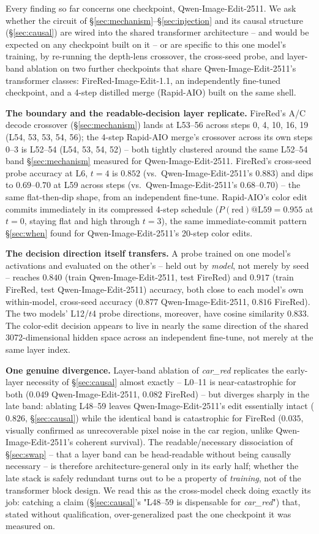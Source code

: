 \documentclass[10pt,twocolumn]{article}
\newcommand{\model}{Qwen-Image-Edit-2511}
\begin{document}
Every finding so far concerns one checkpoint, \model{}. We ask whether the
circuit of \S\ref{sec:mechanism}--\S\ref{sec:injection} and its causal
structure (\S\ref{sec:causal}) are wired into the shared transformer
architecture -- and would be expected on any checkpoint built on it -- or
are specific to this one model's training, by re-running the depth-lens
crossover, the cross-seed probe, and layer-band ablation on two further
checkpoints that share \model{}'s transformer classes: FireRed-Image-Edit-1.1,
an independently fine-tuned checkpoint, and a 4-step distilled merge
(Rapid-AIO) built on the same shell.

\textbf{The boundary and the readable-decision layer replicate.} FireRed's
A/C decode crossover (\S\ref{sec:mechanism}) lands at L53--56 across steps
0, 4, 10, 16, 19 (L54, 53, 53, 54, 56); the 4-step Rapid-AIO merge's
crossover across its own steps 0--3 is L52--54 (L54, 53, 54, 52) -- both
tightly clustered around the same L52--54 band \S\ref{sec:mechanism}
measured for \model{}. FireRed's cross-seed probe accuracy at L6, $t{=}4$
is $0.852$ (vs.\ \model{}'s $0.883$) and dips to $0.69$--$0.70$ at L59
across steps (vs.\ \model{}'s $0.68$--$0.70$) -- the same flat-then-dip
shape, from an independent fine-tune. Rapid-AIO's color edit commits
immediately in its compressed 4-step schedule ($P(\text{red})@\text{L59}
= 0.955$ at $t{=}0$, staying flat and high through $t{=}3$), the same
immediate-commit pattern \S\ref{sec:when} found for \model{}'s 20-step
color edits.

\textbf{The decision direction itself transfers.} A probe trained on one
model's activations and evaluated on the other's -- held out by
\emph{model}, not merely by seed -- reaches $0.840$ (train \model{}, test
FireRed) and $0.917$ (train FireRed, test \model{}) accuracy, both close
to each model's own within-model, cross-seed accuracy ($0.877$ \model{},
$0.816$ FireRed). The two models' L12/$t$4 probe directions, moreover,
have cosine similarity $0.833$. The color-edit decision appears to live in
nearly the same direction of the shared 3072-dimensional hidden space
across an independent fine-tune, not merely at the same layer index.

\textbf{One genuine divergence.} Layer-band ablation of \emph{car\_red}
replicates the early-layer necessity of \S\ref{sec:causal} almost exactly
-- L0--11 is near-catastrophic for both ($0.049$ \model{}, $0.082$
FireRed) -- but diverges sharply in the late band: ablating L48--59 leaves
\model{}'s edit essentially intact ($0.826$, \S\ref{sec:causal}) while the
identical band is catastrophic for FireRed ($0.035$, visually confirmed as
unrecoverable pixel noise in the car region, unlike \model{}'s coherent
survival). The readable/necessary dissociation of \S\ref{sec:swap} -- that
a layer band can be head-readable without being causally necessary -- is
therefore architecture-general only in its early half; whether the late
stack is safely redundant turns out to be a property of \emph{training},
not of the transformer block design. We read this as the cross-model
check doing exactly its job: catching a claim
(\S\ref{sec:causal}'s "L48--59 is dispensable for \emph{car\_red}") that,
stated without qualification, over-generalized past the one checkpoint it
was measured on.
\end{document}
